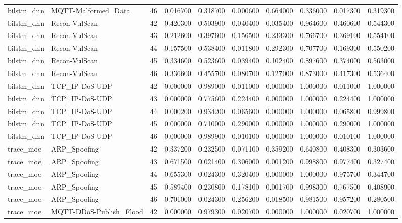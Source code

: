 \begin{table}
\begin{tabular}{llrrrrrrrr}
bilstm\_dnn & MQTT-Malformed\_Data & 46 & 0.016700 & 0.318700 & 0.000600 & 0.664000 & 0.336000 & 0.017300 & 0.319300 \\
bilstm\_dnn & Recon-VulScan & 42 & 0.420300 & 0.503900 & 0.040400 & 0.035400 & 0.964600 & 0.460600 & 0.544300 \\
bilstm\_dnn & Recon-VulScan & 43 & 0.212600 & 0.397600 & 0.156500 & 0.233300 & 0.766700 & 0.369100 & 0.554100 \\
bilstm\_dnn & Recon-VulScan & 44 & 0.157500 & 0.538400 & 0.011800 & 0.292300 & 0.707700 & 0.169300 & 0.550200 \\
bilstm\_dnn & Recon-VulScan & 45 & 0.334600 & 0.523600 & 0.039400 & 0.102400 & 0.897600 & 0.374000 & 0.563000 \\
bilstm\_dnn & Recon-VulScan & 46 & 0.336600 & 0.455700 & 0.080700 & 0.127000 & 0.873000 & 0.417300 & 0.536400 \\
bilstm\_dnn & TCP\_IP-DoS-UDP & 42 & 0.000000 & 0.989000 & 0.011000 & 0.000000 & 1.000000 & 0.011000 & 1.000000 \\
bilstm\_dnn & TCP\_IP-DoS-UDP & 43 & 0.000000 & 0.775600 & 0.224400 & 0.000000 & 1.000000 & 0.224400 & 1.000000 \\
bilstm\_dnn & TCP\_IP-DoS-UDP & 44 & 0.000200 & 0.934200 & 0.065600 & 0.000000 & 1.000000 & 0.065800 & 0.999800 \\
bilstm\_dnn & TCP\_IP-DoS-UDP & 45 & 0.000000 & 0.710000 & 0.290000 & 0.000000 & 1.000000 & 0.290000 & 1.000000 \\
bilstm\_dnn & TCP\_IP-DoS-UDP & 46 & 0.000000 & 0.989900 & 0.010100 & 0.000000 & 1.000000 & 0.010100 & 1.000000 \\
trace\_moe & ARP\_Spoofing & 42 & 0.337200 & 0.232500 & 0.071100 & 0.359200 & 0.640800 & 0.408300 & 0.303600 \\
trace\_moe & ARP\_Spoofing & 43 & 0.671500 & 0.021400 & 0.306000 & 0.001200 & 0.998800 & 0.977400 & 0.327400 \\
trace\_moe & ARP\_Spoofing & 44 & 0.655300 & 0.024300 & 0.320400 & 0.000000 & 1.000000 & 0.975700 & 0.344700 \\
trace\_moe & ARP\_Spoofing & 45 & 0.589400 & 0.230800 & 0.178100 & 0.001700 & 0.998300 & 0.767500 & 0.408900 \\
trace\_moe & ARP\_Spoofing & 46 & 0.701000 & 0.024300 & 0.256200 & 0.018500 & 0.981500 & 0.957200 & 0.280500 \\
trace\_moe & MQTT-DDoS-Publish\_Flood & 42 & 0.000000 & 0.979300 & 0.020700 & 0.000000 & 1.000000 & 0.020700 & 1.000000 \\

\end{tabular}
\end{table}
